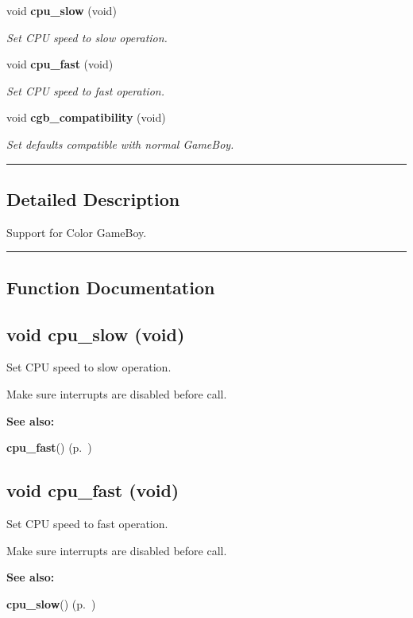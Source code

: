 \begin{CompactItemize}
\item 
void {\bf cpu\_\-slow} (void)
\begin{CompactList}\small\item\em Set CPU speed to slow operation.\item\end{CompactList}

\item 
void {\bf cpu\_\-fast} (void)
\begin{CompactList}\small\item\em Set CPU speed to fast operation.\item\end{CompactList}

\item 
\label{cgb.h_a27}
void {\bf cgb\_\-compatibility} (void)
\begin{CompactList}\small\item\em Set defaults compatible with normal Game\-Boy.\item\end{CompactList}

\end{CompactItemize}
\vspace{0.4cm}\hrule\vspace{0.2cm}
\subsection*{Detailed Description}
Support for Color Game\-Boy.\vspace{0.4cm}\hrule\vspace{0.2cm}
\subsection*{Function Documentation}
\label{cgb.h_a25}
\subsection{\setlength{\rightskip}{0pt plus 5cm}void cpu\_\-slow (void)}

Set CPU speed to slow operation.

Make sure interrupts are disabled before call.

\begin{Desc}
\item[{\bf See also: }]\par
{\bf cpu\_\-fast}() {\rm (p.~\pageref{cgb.h_a26})} \end{Desc}
\label{cgb.h_a26}
\subsection{\setlength{\rightskip}{0pt plus 5cm}void cpu\_\-fast (void)}

Set CPU speed to fast operation.

Make sure interrupts are disabled before call.

\begin{Desc}
\item[{\bf See also: }]\par
{\bf cpu\_\-slow}() {\rm (p.~\pageref{cgb.h_a25})} \end{Desc}
